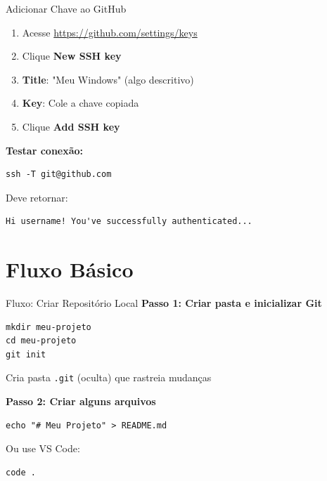 \documentclass[11pt]{beamer}
\begin{document}
\begin{frame}{Adicionar Chave ao GitHub}
\begin{enumerate}
    \item Acesse \url{https://github.com/settings/keys}
    \item Clique \textbf{New SSH key}
    \item \textbf{Title}: "Meu Windows" (algo descritivo)
    \item \textbf{Key}: Cole a chave copiada
    \item Clique \textbf{Add SSH key}
\end{enumerate}

\vspace{0.5cm}

\textbf{Testar conexão:}
\begin{lstlisting}
ssh -T git@github.com
\end{lstlisting}

Deve retornar:
\begin{lstlisting}
Hi username! You've successfully authenticated...
\end{lstlisting}
\end{frame}

\section{Fluxo Básico}

\begin{frame}{Fluxo: Criar Repositório Local}
\textbf{Passo 1: Criar pasta e inicializar Git}

\begin{lstlisting}
mkdir meu-projeto
cd meu-projeto
git init
\end{lstlisting}

Cria pasta \texttt{.git} (oculta) que rastreia mudanças

\vspace{0.5cm}

\textbf{Passo 2: Criar alguns arquivos}

\begin{lstlisting}
echo "# Meu Projeto" > README.md
\end{lstlisting}

Ou use VS Code:
\begin{lstlisting}
code .
\end{lstlisting}
\end{frame}
\end{document}

